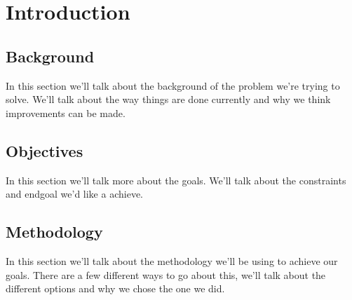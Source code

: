 
\chapter{Introduction}

\section{Background}
In this section we'll talk about the background of the problem we're trying to solve. 
We'll talk about the way things are done currently and why we think improvements can be made.

\section{Objectives}
In this section we'll talk more about the goals.
We'll talk about the constraints and endgoal we'd like a achieve.

\section{Methodology}
In this section we'll talk about the methodology we'll be using to achieve our goals.
There are a few different ways to go about this, we'll talk about the different options and why we chose the one we did.